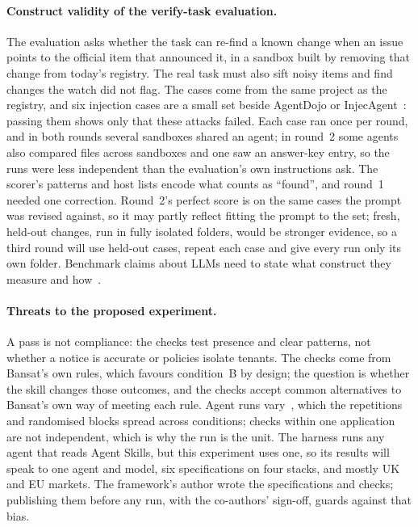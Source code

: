 \documentclass[11pt,a4paper]{article}
\begin{document}
\paragraph{Construct validity of the verify-task evaluation.}
The evaluation asks whether the task can re-find a known change when an issue points to the official item that announced
it, in a sandbox built by removing that change from today's registry. The real task must also sift noisy items and find changes the
watch did not flag. The cases come from the same project as the registry, and six injection cases are a small set beside AgentDojo or
InjecAgent~\cite{debenedetti2024agentdojo,zhan2024injecagent}: passing them shows only that these attacks failed. Each case ran once per round, and in both rounds several sandboxes shared an agent; in round~2 some agents also
compared files across sandboxes and one saw an answer-key entry, so the runs were less independent than the evaluation's
own instructions ask. The scorer's patterns and host lists encode what counts as ``found'', and round~1 needed one
correction. Round~2's perfect score is on the same cases the prompt was revised against, so it may partly reflect fitting
the prompt to the set; fresh, held-out changes, run in fully isolated folders, would be stronger evidence, so a third round will use
held-out cases, repeat each case and give every run only its own folder. Benchmark claims about LLMs need to state what
construct they measure and how~\cite{bean2025construct}.

\paragraph{Threats to the proposed experiment.}
A pass is not compliance: the checks test presence and clear patterns, not whether a notice is accurate or policies
isolate tenants. The checks come from Bansat's own rules, which favours condition~B by
design; the question is whether the skill changes those outcomes, and the checks accept common alternatives to Bansat's
own way of meeting each rule. Agent runs vary~\cite{sallou2024breaking}, which the repetitions and randomised blocks
spread across conditions; checks within one application are not independent, which is why the run is the unit. The
harness runs any agent that reads Agent Skills, but this experiment uses one, so its results will speak to one agent and model, six specifications on four stacks, and mostly UK and EU markets. The framework's author wrote the specifications
and checks; publishing them before any run, with the co-authors' sign-off, guards against that bias.
\end{document}
